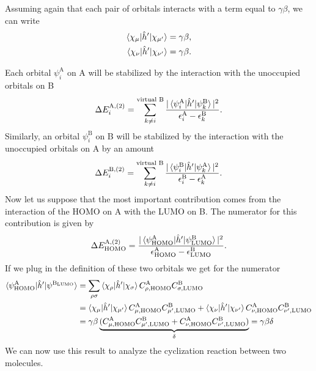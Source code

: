 \documentclass[../Main/chem532-notes.tex]{subfiles}
\begin{document}
Assuming again that each pair of orbitals interacts with a term equal to $\gamma \beta$, we can write
\begin{equation}
\begin{split}
\braket{\chi_\mu | \hat{h}'| \chi_{\mu'}} = \gamma \beta, \\
\braket{\chi_\nu | \hat{h}'| \chi_{\nu'}} = \gamma \beta.
\end{split}
\end{equation}



Each orbital $\psi_i^\mathrm{A}$ on A will be stabilized by the interaction with the unoccupied orbitals on B
\begin{equation}
\Delta E_i^{\mathrm{A},(2)} = \sum_{k \neq i}^\text{virtual B} \frac{|\braket{\psi^\mathrm{A}_i|\hat{h}'|\psi^\mathrm{B}_k}|^2}{\epsilon^\mathrm{A}_i - \epsilon^\mathrm{B}_k}.
\end{equation}
Similarly, an orbital $\psi_i^\mathrm{B}$ on B will be stabilized by the interaction with the unoccupied orbitals on A by an amount
\begin{equation}
\Delta E_i^{\mathrm{B},(2)} = \sum_{k \neq i}^\text{virtual B} \frac{|\braket{\psi^\mathrm{B}_i|\hat{h}'|\psi^\mathrm{A}_k}|^2}{\epsilon^\mathrm{B}_i - \epsilon^\mathrm{A}_k}.
\end{equation}
Now let us suppose that the most important contribution comes from the interaction of the HOMO on A with the LUMO on B. The numerator for this contribution is given by
\begin{equation}
\Delta E_\mathrm{HOMO}^{\mathrm{A},(2)} = \frac{|\braket{\psi^\mathrm{A}_{\mathrm{HOMO}}|\hat{h}'|\psi^\mathrm{B}_{\mathrm{LUMO}}}|^2}{\epsilon^\mathrm{A}_{\mathrm{HOMO}}- \epsilon^\mathrm{B}_{\mathrm{LUMO}}}.
\end{equation}
If we plug in the definition of these two orbitals we get for the numerator
\begin{equation}
\begin{split}
\braket{\psi^\mathrm{A}_{\mathrm{HOMO}}|\hat{h}'|\psi^\mathrm{B_{\mathrm{LUMO}}}} &=
\sum_{\rho\sigma} 
\braket{\chi_\rho|\hat{h}'|\chi_\sigma}
C_{\rho,\mathrm{HOMO}}^\mathrm{A} C_{\sigma,\mathrm{LUMO}}^\mathrm{B} \\
&=
\braket{\chi_\mu|\hat{h}'|\chi_{\mu'}}
C_{\mu,\mathrm{HOMO}}^\mathrm{A} C_{\mu',\mathrm{LUMO}}^\mathrm{B}
+\braket{\chi_\nu|\hat{h}'|\chi_{\nu'}}
C_{\nu,\mathrm{HOMO}}^\mathrm{A} C_{\nu',\mathrm{LUMO}}^\mathrm{B}
\\
&=
\gamma\beta \underbrace{(
C_{\mu,\mathrm{HOMO}}^\mathrm{A} C_{\mu',\mathrm{LUMO}}^\mathrm{B}
+
C_{\nu,\mathrm{HOMO}}^\mathrm{A} C_{\nu',\mathrm{LUMO}}^\mathrm{B}
)}_{\delta}
=
\gamma\beta\delta
\end{split}
\end{equation}
We can now use this result to analyze the cyclization reaction between two molecules.
\end{document}
